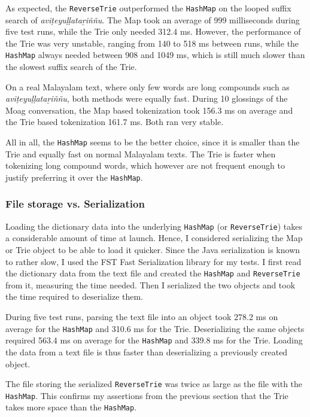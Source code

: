 \documentclass[a4paper]{article}
\newcommand{\typ}[1]{\texttt{#1}}
\begin{document}
As expected, the \typ{ReverseTrie} outperformed the \typ{HashMap} on the looped suffix search of \textit{aviṭeyuḷḷataṟiññu}. The Map took an average of 999 milliseconds during five test runs, while the Trie only needed 312.4 ms. However, the performance of the Trie was very unstable, ranging from 140 to 518 ms between runs, while the \typ{HashMap} always needed between 908 and 1049 ms, which is still much slower than the slowest suffix search of the Trie.

On a real Malayalam text, where only few words are long compounds such as \textit{aviṭeyuḷḷataṟiññu}, both methods were equally fast. During 10 glossings of the Moag conversation, the Map based tokenization took 156.3 ms on average and the Trie based tokenization 161.7 ms. Both ran very stable.

All in all, the \typ{HashMap} seems to be the better choice, since it is smaller than the Trie and equally fast on normal Malayalam texts. The Trie is faster when tokenizing long compound words, which however are not frequent enough to justify preferring it over the \typ{HashMap}.

\subsubsection*{File storage vs. Serialization}

Loading the dictionary data into the underlying \typ{HashMap} (or \typ{ReverseTrie}) takes a considerable amount of time at launch. Hence, I considered serializing the Map or Trie object to be able to load it quicker. Since the Java serialization is known to rather slow, I used the FST Fast Serialization library for my tests. I first read the dictionary data from the text file and created the \typ{HashMap} and \typ{ReverseTrie} from it, measuring the time needed. Then I serialized the two objects and took the time required to deserialize them.

During five test runs, parsing the text file into an object took 278.2 ms on average for the \typ{HashMap} and 310.6 ms for the Trie. Deserializing the same objects required 563.4 ms on average for the \typ{HashMap} and 339.8 ms for the Trie. Loading the data from a text file is thus faster than deserializing a previously created object.

The file storing the serialized \typ{ReverseTrie} was twice as large as the file with the \typ{HashMap}. This confirms my assertions from the previous section that the Trie takes more space than the \typ{HashMap}.
\end{document}
